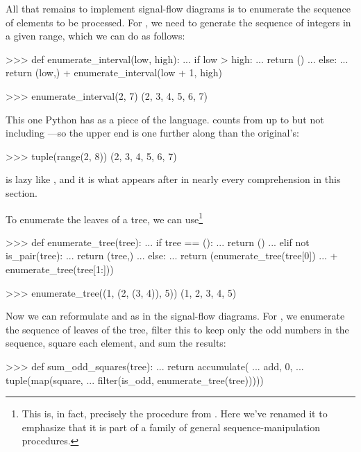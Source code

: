 All that remains to implement signal-flow diagrams is to enumerate the sequence
of elements to be processed.  For , we need to generate the
sequence of integers in a given range, which we can do as follows:

\begin{codeBlock}
>>> def enumerate_interval(low, high):
...     if low > high:
...         return ()
...     else:
...         return (low,) + enumerate_interval(low + 1, high)

>>> enumerate_interval(2, 7)
(2, 3, 4, 5, 6, 7)
\end{codeBlock}

\noindent
\begin{revealTheSurface}
This one Python has as a piece of the language.   counts
from  up to but not including ---so the upper end is one
further along than the original's:

\begin{codeBlock}
>>> tuple(range(2, 8))
(2, 3, 4, 5, 6, 7)
\end{codeBlock}

\noindent
{} is lazy like , and it is what appears after 
in nearly every comprehension in this section.
\end{revealTheSurface}

\noindent
To enumerate the leaves of a tree, we can use\footnote{This is, in fact,
precisely the  procedure from .  Here we've
renamed it to emphasize that it is part of a family of general
sequence-manipulation procedures.}

\begin{codeBlock}
>>> def enumerate_tree(tree):
...     if tree == ():
...         return ()
...     elif not is_pair(tree):
...         return (tree,)
...     else:
...         return (enumerate_tree(tree[0])
...                 + enumerate_tree(tree[1:]))

>>> enumerate_tree((1, (2, (3, 4)), 5))
(1, 2, 3, 4, 5)
\end{codeBlock}

\noindent
Now we can reformulate  and  as in the
signal-flow diagrams.  For , we enumerate the sequence
of leaves of the tree, filter this to keep only the odd numbers in the
sequence, square each element, and sum the results:

\begin{codeBlock}
>>> def sum_odd_squares(tree):
...     return accumulate(
...         add, 0,
...         tuple(map(square,
...                   filter(is_odd, enumerate_tree(tree)))))
\end{codeBlock}

